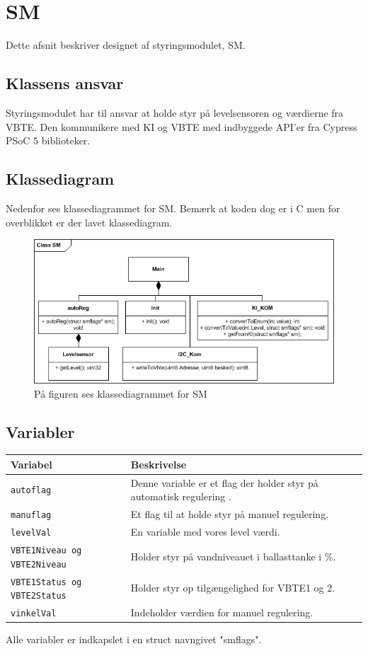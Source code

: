 \chapter{SM}
Dette afsnit beskriver designet af styringsmodulet, SM.
\section{Klassens ansvar}
Styringsmodulet har til ansvar at holde styr på levelsensoren og værdierne fra VBTE. Den kommunikere med KI og VBTE med indbyggede API'er fra Cypress PSoC 5 biblioteker. 
\section{Klassediagram}
Nedenfor ses klassediagrammet for SM. Bemærk at koden dog er i C men for overblikket er der lavet klassediagram.
\begin{figure}[H]
\centering
\includegraphics[width=1\textwidth]{billeder/smKlassediagram}
\caption{På figuren ses klassediagrammet for SM}
\end{figure}
\section{Variabler}
\begin{table}[H]
\begin{tabular}{|l|p{10cm}|}
\hline
\cellcolor[gray]{0.8}\textbf{Variabel} &\cellcolor[gray]{0.8} \textbf{Beskrivelse}\\ \hline
\texttt{autoflag} & Denne variable er et flag der holder styr på automatisk regulering .\\ \hline
\texttt{manuflag} & Et flag til at holde styr på manuel regulering.\\ \hline
\texttt{levelVal} & En variable med vores level værdi.\\ \hline
\texttt{VBTE1Niveau og VBTE2Niveau} & Holder styr på vandniveauet i ballasttanke i \%. \\ \hline
\texttt{VBTE1Status og VBTE2Status} & Holder styr op tilgængelighed for VBTE1 og 2.\\ \hline
\texttt{vinkelVal} & Indeholder værdien for manuel regulering.\\ \hline
\end{tabular}
\end{table}
Alle variabler er indkapslet i en struct navngivet "smflags".
